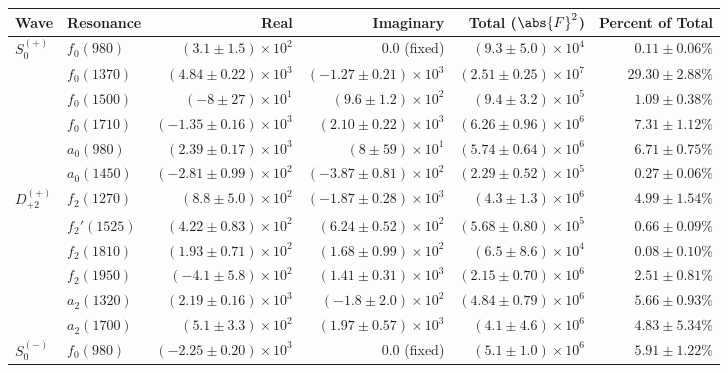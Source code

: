 \begin{table}[ht]
    \begin{center}
        \begin{tabular}{llrrrr}\toprule
        Wave & Resonance & Real & Imaginary & Total ($\abs{F}^2$) & Percent of Total \\\midrule
$S_{0}^{(+)}$ & $f_{0}(980)$ & $(3.1 \pm 1.5) \times 10^{2}$ & $0.0$ (fixed) & $(9.3 \pm 5.0) \times 10^{4}$ & $0.11 \pm 0.06 \%$ \\
 & $f_{0}(1370)$ & $(4.84 \pm 0.22) \times 10^{3}$ & $(-1.27 \pm 0.21) \times 10^{3}$ & $(2.51 \pm 0.25) \times 10^{7}$ & $29.30 \pm 2.88 \%$ \\
 & $f_{0}(1500)$ & $(-8 \pm 27) \times 10^{1}$ & $(9.6 \pm 1.2) \times 10^{2}$ & $(9.4 \pm 3.2) \times 10^{5}$ & $1.09 \pm 0.38 \%$ \\
 & $f_{0}(1710)$ & $(-1.35 \pm 0.16) \times 10^{3}$ & $(2.10 \pm 0.22) \times 10^{3}$ & $(6.26 \pm 0.96) \times 10^{6}$ & $7.31 \pm 1.12 \%$ \\
 & $a_{0}(980)$ & $(2.39 \pm 0.17) \times 10^{3}$ & $(8 \pm 59) \times 10^{1}$ & $(5.74 \pm 0.64) \times 10^{6}$ & $6.71 \pm 0.75 \%$ \\
 & $a_{0}(1450)$ & $(-2.81 \pm 0.99) \times 10^{2}$ & $(-3.87 \pm 0.81) \times 10^{2}$ & $(2.29 \pm 0.52) \times 10^{5}$ & $0.27 \pm 0.06 \%$ \\
$D_{+2}^{(+)}$ & $f_{2}(1270)$ & $(8.8 \pm 5.0) \times 10^{2}$ & $(-1.87 \pm 0.28) \times 10^{3}$ & $(4.3 \pm 1.3) \times 10^{6}$ & $4.99 \pm 1.54 \%$ \\
 & $f_{2}'(1525)$ & $(4.22 \pm 0.83) \times 10^{2}$ & $(6.24 \pm 0.52) \times 10^{2}$ & $(5.68 \pm 0.80) \times 10^{5}$ & $0.66 \pm 0.09 \%$ \\
 & $f_{2}(1810)$ & $(1.93 \pm 0.71) \times 10^{2}$ & $(1.68 \pm 0.99) \times 10^{2}$ & $(6.5 \pm 8.6) \times 10^{4}$ & $0.08 \pm 0.10 \%$ \\
 & $f_{2}(1950)$ & $(-4.1 \pm 5.8) \times 10^{2}$ & $(1.41 \pm 0.31) \times 10^{3}$ & $(2.15 \pm 0.70) \times 10^{6}$ & $2.51 \pm 0.81 \%$ \\
 & $a_{2}(1320)$ & $(2.19 \pm 0.16) \times 10^{3}$ & $(-1.8 \pm 2.0) \times 10^{2}$ & $(4.84 \pm 0.79) \times 10^{6}$ & $5.66 \pm 0.93 \%$ \\
 & $a_{2}(1700)$ & $(5.1 \pm 3.3) \times 10^{2}$ & $(1.97 \pm 0.57) \times 10^{3}$ & $(4.1 \pm 4.6) \times 10^{6}$ & $4.83 \pm 5.34 \%$ \\
$S_{0}^{(-)}$ & $f_{0}(980)$ & $(-2.25 \pm 0.20) \times 10^{3}$ & $0.0$ (fixed) & $(5.1 \pm 1.0) \times 10^{6}$ & $5.91 \pm 1.22 \%$ \\

\end{tabular}
\end{center}
\end{table}
